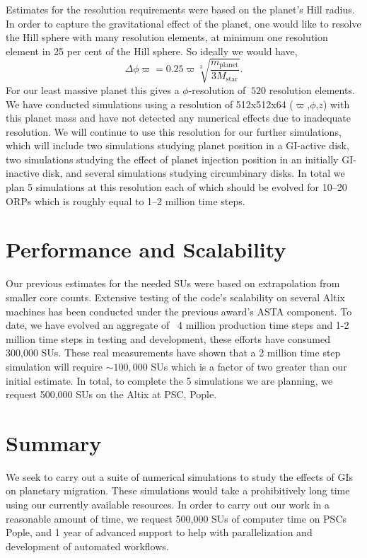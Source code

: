 \documentclass[12pt,preprint2]{aastex}
\begin{document}
Estimates for the resolution requirements were based on the planet's Hill radius. In order to capture the gravitational
effect of the planet, one would like to resolve the Hill sphere with many resolution elements, at minimum one resolution
element in 25 per cent of the Hill sphere. So ideally we would have,
\begin{equation}
\Delta \phi \varpi = 0.25\varpi \sqrt[3]{\frac{m_{\mathrm{planet}}}{3M_{\mathrm{star}}}}.
\end{equation}
For our least massive planet this gives a $\phi$-resolution of $~ 520$ resolution elements. We have conducted
simulations using a resolution of 512x512x64 ($\varpi$,$\phi$,$z$) with this planet mass and have not detected any
numerical effects due to inadequate resolution. We will continue to use this resolution for our further simulations,
which will include two simulations studying planet position in a GI-active disk, two simulations studying the effect of
planet injection position in an initially GI-inactive disk, and several simulations studying circumbinary disks. In
total we plan 5 simulations at this resolution each of which should be evolved for 10--20 ORPs which is roughly equal to
1--2 million time steps.

\section{Performance and Scalability}
\label{sec:performance}

Our previous estimates for the needed SUs were based on extrapolation from smaller core counts. Extensive testing of the
code's scalability on several Altix machines has been conducted under the previous award's ASTA component. To date, we
have evolved an aggregate of ~4 million production time steps and 1-2 million time steps in testing and development,
these efforts have consumed 300,000 SUs. These real measurements have shown that a 2 million time step simulation will
require $\sim\!\!100,000$ SUs which is a factor of two greater than our initial estimate. In total, to complete the 5
simulations we are planning, we request 500,000 SUs on the Altix at PSC, Pople.

\section{Summary}
\label{sec:summary} 

We seek to carry out a suite of numerical simulations to study the effects of GIs on planetary migration. These
simulations would take a prohibitively long time using our currently available resources. In order to carry out our work
in a reasonable amount of time, we request 500,000 SUs of computer time on PSCs Pople, and 1 year of advanced support to
help with parallelization and development of automated workflows.

\scriptsize
\setlength{\baselineskip}{7.5pt}
\setlength{\bibspacing}{\baselineskip}



\end{document}
